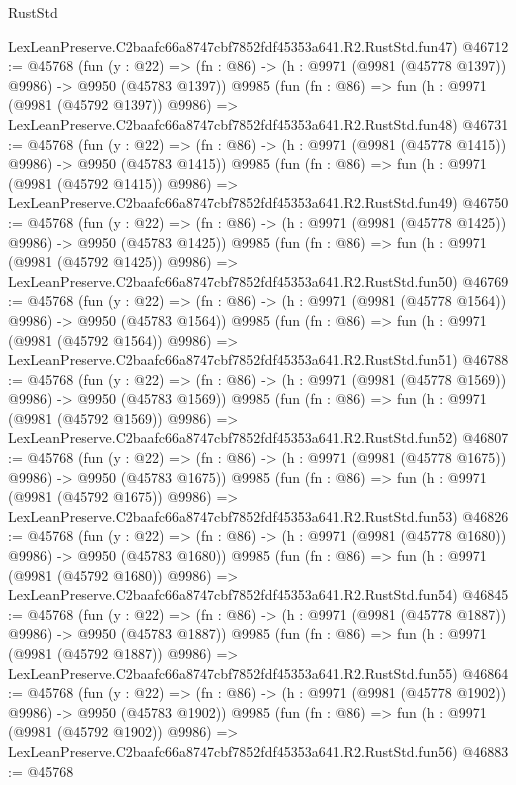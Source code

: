 \begin{lexlean}{RustStd}
\begin{coremodule}
    LexLeanPreserve.C2baafc66a8747cbf7852fdf45353a641.R2.RustStd.fun47)
@46712 := @45768
    (fun (y : @22) =>
    (fn : @86) -> (h : @9971 (@9981 (@45778 @1397)) @9986) -> @9950 (@45783 @1397))
    @9985
    (fun (fn : @86) =>
    fun (h : @9971 (@9981 (@45792 @1397)) @9986) =>
    LexLeanPreserve.C2baafc66a8747cbf7852fdf45353a641.R2.RustStd.fun48)
@46731 := @45768
    (fun (y : @22) =>
    (fn : @86) -> (h : @9971 (@9981 (@45778 @1415)) @9986) -> @9950 (@45783 @1415))
    @9985
    (fun (fn : @86) =>
    fun (h : @9971 (@9981 (@45792 @1415)) @9986) =>
    LexLeanPreserve.C2baafc66a8747cbf7852fdf45353a641.R2.RustStd.fun49)
@46750 := @45768
    (fun (y : @22) =>
    (fn : @86) -> (h : @9971 (@9981 (@45778 @1425)) @9986) -> @9950 (@45783 @1425))
    @9985
    (fun (fn : @86) =>
    fun (h : @9971 (@9981 (@45792 @1425)) @9986) =>
    LexLeanPreserve.C2baafc66a8747cbf7852fdf45353a641.R2.RustStd.fun50)
@46769 := @45768
    (fun (y : @22) =>
    (fn : @86) -> (h : @9971 (@9981 (@45778 @1564)) @9986) -> @9950 (@45783 @1564))
    @9985
    (fun (fn : @86) =>
    fun (h : @9971 (@9981 (@45792 @1564)) @9986) =>
    LexLeanPreserve.C2baafc66a8747cbf7852fdf45353a641.R2.RustStd.fun51)
@46788 := @45768
    (fun (y : @22) =>
    (fn : @86) -> (h : @9971 (@9981 (@45778 @1569)) @9986) -> @9950 (@45783 @1569))
    @9985
    (fun (fn : @86) =>
    fun (h : @9971 (@9981 (@45792 @1569)) @9986) =>
    LexLeanPreserve.C2baafc66a8747cbf7852fdf45353a641.R2.RustStd.fun52)
@46807 := @45768
    (fun (y : @22) =>
    (fn : @86) -> (h : @9971 (@9981 (@45778 @1675)) @9986) -> @9950 (@45783 @1675))
    @9985
    (fun (fn : @86) =>
    fun (h : @9971 (@9981 (@45792 @1675)) @9986) =>
    LexLeanPreserve.C2baafc66a8747cbf7852fdf45353a641.R2.RustStd.fun53)
@46826 := @45768
    (fun (y : @22) =>
    (fn : @86) -> (h : @9971 (@9981 (@45778 @1680)) @9986) -> @9950 (@45783 @1680))
    @9985
    (fun (fn : @86) =>
    fun (h : @9971 (@9981 (@45792 @1680)) @9986) =>
    LexLeanPreserve.C2baafc66a8747cbf7852fdf45353a641.R2.RustStd.fun54)
@46845 := @45768
    (fun (y : @22) =>
    (fn : @86) -> (h : @9971 (@9981 (@45778 @1887)) @9986) -> @9950 (@45783 @1887))
    @9985
    (fun (fn : @86) =>
    fun (h : @9971 (@9981 (@45792 @1887)) @9986) =>
    LexLeanPreserve.C2baafc66a8747cbf7852fdf45353a641.R2.RustStd.fun55)
@46864 := @45768
    (fun (y : @22) =>
    (fn : @86) -> (h : @9971 (@9981 (@45778 @1902)) @9986) -> @9950 (@45783 @1902))
    @9985
    (fun (fn : @86) =>
    fun (h : @9971 (@9981 (@45792 @1902)) @9986) =>
    LexLeanPreserve.C2baafc66a8747cbf7852fdf45353a641.R2.RustStd.fun56)
@46883 := @45768

\end{coremodule}
\end{lexlean}
